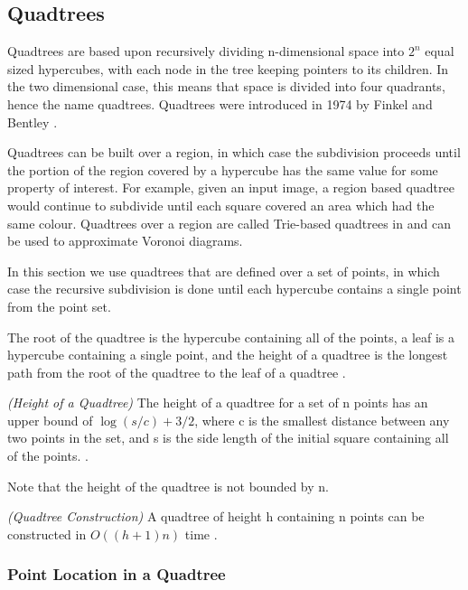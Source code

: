 \documentclass[mcs]{scsthesis}
\begin{document}
\subsection{Quadtrees}

Quadtrees are based upon recursively dividing n-dimensional space into \(2^n\)
equal sized hypercubes, with each node in the tree keeping pointers to its
children.  In the two dimensional case, this means that space is divided into
four quadrants, hence the name quadtrees. Quadtrees were introduced in 1974 by
Finkel and Bentley \cite{quadtree}. 

Quadtrees can be built over a region, in which case the subdivision proceeds
until the portion of the region covered by a hypercube has the same value for
some property of interest. For example, given an input image, a region based
quadtree would continue to subdivide until each square covered an area which
had the same colour. Quadtrees over a region are called Trie-based quadtrees in
\cite{samet} and can be used to approximate Voronoi diagrams. 

In this section we use quadtrees that are defined over a set of points, in which
case the recursive subdivision is done until each hypercube contains a single
point from the point set.

The root of the quadtree is the hypercube containing all of the points, a leaf
is a hypercube containing a single point, and the height of a quadtree
is the longest path from the root of the quadtree to the leaf of a quadtree
\cite{dutch}.

\begin{thm} \emph{(Height of a Quadtree)}
The height of a quadtree for a set of n points has an upper bound of \(\log(s/c)
+ 3/2\), where c is the smallest distance between any two points in the set, and
s is the side length of the initial square containing all of the points.
\cite{dutch}.
\end{thm}

Note that the height of the quadtree is not bounded by n.

\begin{thm} \emph{(Quadtree Construction)}
A quadtree of height h containing n points can be constructed in \(O((h + 1)n)\)
time \cite{dutch}.
\end{thm}

\subsubsection{Point Location in a Quadtree}
\end{document}
